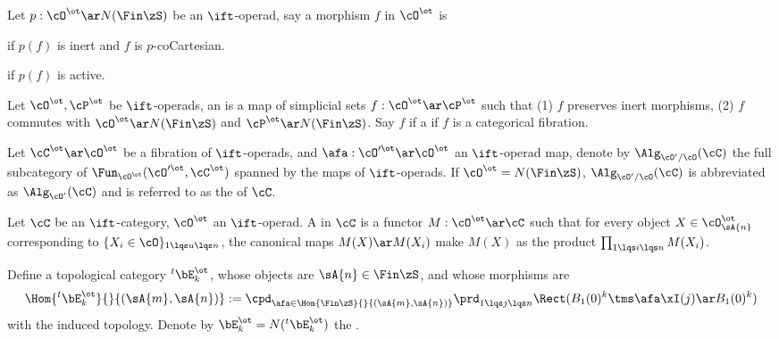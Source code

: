 \documentclass[article, a4paper, twoside]{universal}
\begin{document}
\begin{dfn}[2.1.2.3]
    Let $p:\cO^{\ot}\ar N(\Fin\zS)$ be an $\ift$-operad, say a morphism $f$ in $\cO^{\ot}$ is
    \begin{enr}[label=(\arabic*)]
        \item {} if $p(f)$ is inert and $f$ is $p$-coCartesian.
        \item {} if $p(f)$ is active.
    \end{enr}
\end{dfn}

\begin{dfn}[2.1.2.7, 2.1.2.10]
    Let $\cO^{\ot},\cP^{\ot}$ be $\ift$-operads, an  is a map of simplicial sets $f:\cO^{\ot}\ar\cP^{\ot}$ such that (1) $f$ preserves inert morphisms, (2) $f$ commutes with $\cO^{\ot}\ar N(\Fin\zS)$ and $\cP^{\ot}\ar N(\Fin\zS)$. Say $f$ if a  if $f$ is a categorical fibration.
\end{dfn}

\begin{dfn}[2.1.3.1]
    Let $\cC^{\ot}\ar\cO^{\ot}$ be a fibration of $\ift$-operads, and $\afa:\cO'^{\ot}\ar\cO^{\ot}$ an $\ift$-operad map, denote by $\Alg_{\cO'/\cO}(\cC)$ the full subcategory of $\Fun_{\cO^{\ot}}(\cO'^{\ot},\cC^{\ot})$ spanned by the maps of $\ift$-operads. If $\cO^{\ot}=N(\Fin\zS)$, $\Alg_{\cO'/\cO}(\cC)$ is abbreviated as $\Alg_{\cO'}(\cC)$ and is referred to as the  of $\cC$.
\end{dfn}


\begin{dfn}[2.4.2.1]
    Let $\cC$ be an $\ift$-category, $\cO^{\ot}$ an $\ift$-operad. A  in $\cC$ is a functor $M:\cO^{\ot}\ar\cC$ such that for every object $X\in\cO_{\sA{n}}^{\ot}$ corresponding to $\{X_{i}\in\cO\}_{1\lqs u\lqs n}$, the canonical maps $M(X)\ar M(X_{i})$ make $M(X)$ as the product $\prod_{1\lqs i\lqs n} M(X_{i})$.
\end{dfn}


\begin{dfn}[5.1.0.2, 5.1.0.4]
    Define a topological category ${}^{t}\bE_{k}^{\ot}$, whose objects are $\sA{n}\in\Fin\zS$, and whose morphisms are
    \[
        \Hom{{}^{t}\bE_{k}^{\ot}}{}{(\sA{m},\sA{n})}:=\cpd_{\afa\in\Hom{\Fin\zS}{}{(\sA{m},\sA{n})}}\prd_{1\lqs j\lqs n}\Rect(B_{1}(0)^{k}\tms\afa\xI(j)\ar B_{1}(0)^{k})
    \]
    with the induced topology. Denote by $\bE_{k}^{\ot}=N({}^{t}\bE_{k}^{\ot})$ the .
\end{dfn}
\end{document}
